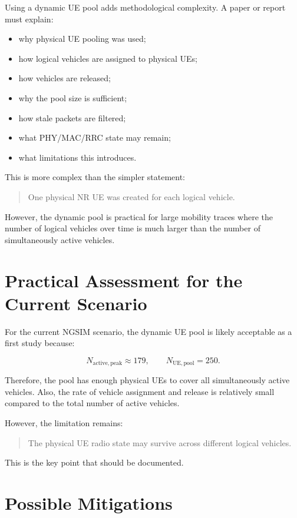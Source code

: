 \documentclass[11pt]{article}
\begin{document}
Using a dynamic UE pool adds methodological complexity. A paper or report must explain:

\begin{itemize}
    \item why physical UE pooling was used;
    \item how logical vehicles are assigned to physical UEs;
    \item how vehicles are released;
    \item why the pool size is sufficient;
    \item how stale packets are filtered;
    \item what PHY/MAC/RRC state may remain;
    \item what limitations this introduces.
\end{itemize}

This is more complex than the simpler statement:

\begin{quote}
One physical NR UE was created for each logical vehicle.
\end{quote}

However, the dynamic pool is practical for large mobility traces where the number of logical vehicles over time is much larger than the number of simultaneously active vehicles.

\section{Practical Assessment for the Current Scenario}

For the current NGSIM scenario, the dynamic UE pool is likely acceptable as a first study because:

\[
N_{\mathrm{active,peak}} \approx 179,
\qquad
N_{\mathrm{UE,pool}} = 250.
\]

Therefore, the pool has enough physical UEs to cover all simultaneously active vehicles. Also, the rate of vehicle assignment and release is relatively small compared to the total number of active vehicles.

However, the limitation remains:

\begin{quote}
The physical UE radio state may survive across different logical vehicles.
\end{quote}

This is the key point that should be documented.

\section{Possible Mitigations}
\end{document}
